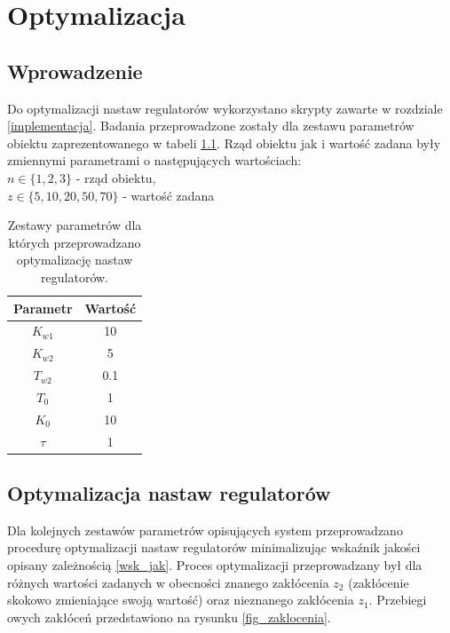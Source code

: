 \chapter{Optymalizacja}
 
\section{Wprowadzenie}

Do optymalizacji nastaw regulatorów wykorzystano skrypty zawarte w rozdziale \ref{implementacja}. Badania przeprowadzone zostały dla zestawu parametrów obiektu zaprezentowanego w tabeli \ref{tab_par}. Rząd obiektu jak i wartość zadana były zmiennymi parametrami o następujących wartościach: \\
$ n \in \{1,2,3\} $ - rząd obiektu, \\
$ z \in \{ 5,10,20,50,70\}$ - wartość zadana \\ 
\begin{table}[h!]
	\centering
	\caption{Zestawy parametrów dla których przeprowadzano optymalizację nastaw regulatorów.}
	\label{tab_par}
	\begin{tabular}{|c|c|} \hline
	Parametr & Wartość \\ \hline
	$K_{w1}$  & 10 \\ \hline
	$K_{w2}$  & 5 \\ \hline
	$T_{w2}$  & 0.1 \\ \hline
	$T_0$   & 1 \\ \hline
	$K_0$   & 10 \\ \hline
	$\tau$ & 1 \\ \hline
	\end{tabular}
\end{table}
\FloatBarrier

\section{Optymalizacja nastaw regulatorów}
Dla kolejnych zestawów parametrów opisujących system przeprowadzano procedurę optymalizacji nastaw regulatorów minimalizując wska\'znik jakości opisany zależnością \ref{wsk_jak}. Proces optymalizacji przeprowadzany był dla różnych wartości zadanych w obecności znanego zakłócenia $z_2$ (zakłócenie skokowo zmieniające swoją wartość) oraz nieznanego zakłócenia $z_1$. Przebiegi owych zakłóceń przedstawiono na rysunku \ref{fig_zaklocenia}. 

